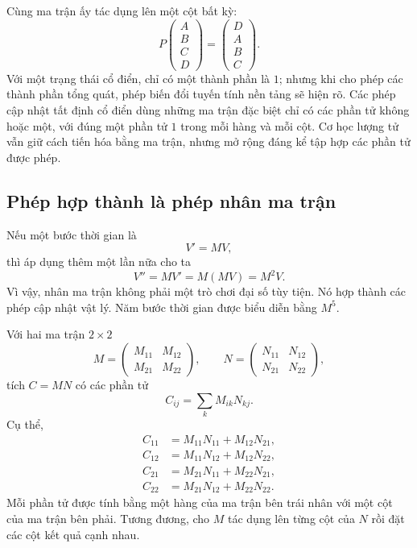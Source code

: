Cùng ma trận ấy tác dụng lên một cột bất kỳ:
\begin{equation}
  P
  \begin{pmatrix}A\\B\\C\\D\end{pmatrix}
  =
  \begin{pmatrix}D\\A\\B\\C\end{pmatrix}.
  \label{eq:l01-cyclic-shift}
\end{equation}
Với một trạng thái cổ điển, chỉ có một thành phần là \(1\); nhưng khi cho phép các thành phần tổng quát, phép biến đổi tuyến tính nền tảng sẽ hiện rõ. Các phép cập nhật tất định cổ điển dùng những ma trận đặc biệt chỉ có các phần tử không hoặc một, với đúng một phần tử \(1\) trong mỗi hàng và mỗi cột. Cơ học lượng tử vẫn giữ cách tiến hóa bằng ma trận, nhưng mở rộng đáng kể tập hợp các phần tử được phép.

\subsection{Phép hợp thành là phép nhân ma trận}

Nếu một bước thời gian là
\begin{equation}
  V'=MV,
\end{equation}
thì áp dụng thêm một lần nữa cho ta
\begin{equation}
  V''=MV'=M(MV)=M^2V.
  \label{eq:l01-two-updates}
\end{equation}
Vì vậy, nhân ma trận không phải một trò chơi đại số tùy tiện. Nó hợp thành các phép cập nhật vật lý. Năm bước thời gian được biểu diễn bằng \(M^5\).

Với hai ma trận \(2\times2\)
\begin{equation}
  M=
  \begin{pmatrix}
    M_{11}&M_{12}\\
    M_{21}&M_{22}
  \end{pmatrix},
  \qquad
  N=
  \begin{pmatrix}
    N_{11}&N_{12}\\
    N_{21}&N_{22}
  \end{pmatrix},
\end{equation}
tích \(C=MN\) có các phần tử
\begin{equation}
  C_{ij}=\sum_k M_{ik}N_{kj}.
  \label{eq:l01-matrix-product}
\end{equation}
Cụ thể,
\begin{align}
  C_{11}&=M_{11}N_{11}+M_{12}N_{21},\\
  C_{12}&=M_{11}N_{12}+M_{12}N_{22},\\
  C_{21}&=M_{21}N_{11}+M_{22}N_{21},\\
  C_{22}&=M_{21}N_{12}+M_{22}N_{22}.
\end{align}
Mỗi phần tử được tính bằng một hàng của ma trận bên trái nhân với một cột của ma trận bên phải. Tương đương, cho \(M\) tác dụng lên từng cột của \(N\) rồi đặt các cột kết quả cạnh nhau.


